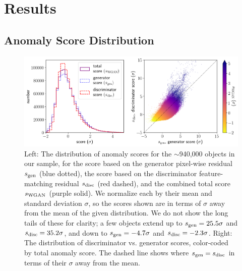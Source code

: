 


\section{Results}
\label{sec:results_anomalies}

\subsection{Anomaly Score Distribution}
\label{sec:sanom_dist}

\begin{figure}
    \centering
    \includegraphics[width=\textwidth]{score_distribution}
    \caption{Left: The distribution of anomaly scores for the $\sim$940,000 objects in our sample, for the score based on the generator pixel-wise residual $s_\mathrm{gen}$ (blue dotted), the score based on the discriminator feature-matching residual $s_\mathrm{disc}$ (red dashed), and the combined total score $s_\mathrm{WGAN}$ (purple solid). We normalize each by their mean and standard deviation $\sigma$, so the scores shown are in terms of $\sigma$ away from the mean of the given distribution. We do not show the long tails of these for clarity; a few objects extend up to $s_\mathrm{gen}=25.5\sigma$ and $s_\mathrm{disc}=35.2\sigma$, and down to $s_\mathrm{gen}=-4.7\sigma$ and $s_\mathrm{disc}=-2.3\sigma$.
    Right: The distribution of discriminator vs. generator scores, color-coded by total anomaly score. The dashed line shows where $s_\mathrm{gen}=s_\mathrm{disc}$ in terms of their $\sigma$ away from the mean.}
    \label{fig:dist}
\end{figure}

